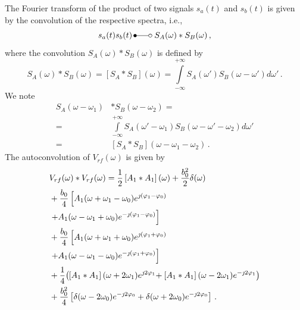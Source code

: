 \documentclass[journal]{IEEEtran}
\newcommand{\Int}{\int\limits_{-\infty}^{+\infty}}
\newcommand{\FDTD}{\unitlength1ex \begin{picture}(6.2,1.6)%
            \put(0.8,0.6){\circle*{1.0}}%
            \put(1.30,0.6){\line(1,0){3.25}}    %
            \put(5.05,0.6){\circle{1.0}}\end{picture}}
\begin{document}
%
The Fourier transform of the product of two signals $s_a(t)$ and $s_b(t)$ is given by the convolution of the respective spectra, i.e.,
%
\begin{equation}	\label{eqmix032}
	s_a(t) s_b(t) \FDTD S_A(\omega) \ast S_B(\omega)\, ,
\end{equation}
%
where the convolution $S_A(\omega) \ast S_B(\omega)$ is defined by
%
\begin{equation}	\label{eqmix034}
S_A(\omega) \ast S_B(\omega)  = \left[ S_A \ast S_B \right] (\omega)
	 = \Int S_A(\omega') S_B(\omega-\omega') d \omega' \, . 
\end{equation}
%
We note 
%
\begin{align}	\label{eqmix036}
S_A(\omega-\omega_1) &  \ast S_B(\omega-\omega_2)  = \\
= & \Int  S_A(\omega' -\omega_1) S_B(\omega-\omega' -\omega_2) d \omega' \nonumber \\
= & \left[ S_A \ast S_B \right] (\omega-\omega_1-\omega_2) \, . \nonumber
\end{align}
The autoconvolution of $V_{rf}(\omega)$ is given by
%
\begin{align}	\label{eqmix040}  
	& V_{rf}(\omega) \ast V_{rf}(\omega) =  \frac{1}{2} \left[A_1\ast A_1\right](\omega) +\frac{b_0^2}{2} \delta(\omega) \\
	                &      +  \frac{b_0}{4}\left[ A_1(\omega + \omega_1 -\omega_0 )e^{\jmath (\varphi_1-\varphi_0)} \right. \nonumber \\
	                &\left.+ A_1(\omega - \omega_1 +\omega_0 )e^{-\jmath (\varphi_1-\varphi_0)} \right]  \nonumber \\
	                &      +  \frac{b_0}{4}\left[ A_1(\omega + \omega_1 +\omega_0 )e^{\jmath (\varphi_1+\varphi_0)} \right. \nonumber \\
	                &\left.+ A_1(\omega - \omega_1 -\omega_0 )e^{-\jmath (\varphi_1+\varphi_0)} \right]  \nonumber \\	                
	                 &+   \frac1{4} \big( \hspace{-0.8mm}\left[A_1\ast A_1\right](\omega+2\omega_1) e^{\jmath 2\varphi_1} %
	                \hspace{-0.8mm}+\left[A_1\ast A_1\right](\omega-2\omega_1) e^{-\jmath 2\varphi_1} \big)\nonumber \\  
	                &      +  \frac{b_0^2}{4}\left[ \delta(\omega -2\omega_0) e^{-\jmath 2\varphi_0} + \delta(\omega +2\omega_0)e^{-\jmath 2\varphi_0}\right] \nonumber 
	                \, . 
\end{align}
\end{document}
